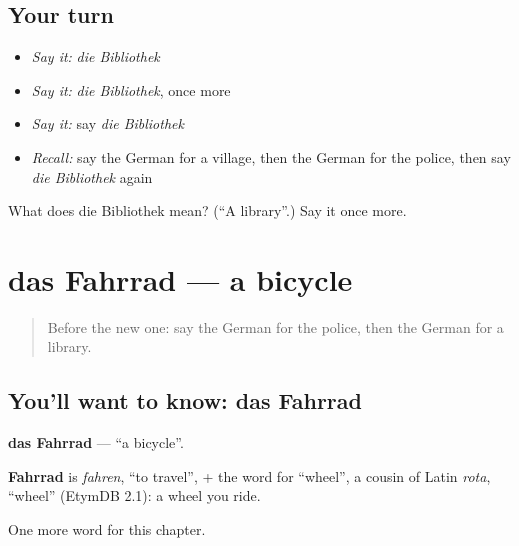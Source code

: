 \subsection*{Your turn}
\begin{itemize}
\raggedright
  \item \emph{Say it:} \emph{die Bibliothek}
  \item \emph{Say it:} \emph{die Bibliothek}, once more
  \item \emph{Say it:} say \emph{die Bibliothek}
  \item \emph{Recall:} say the German for a village, then the German for the police, then say \emph{die Bibliothek} again
\end{itemize}

\begin{tcolorbox}[breakable,colback=teal!4,colframe=teal!35!black,title={Before you move on}]
What does die Bibliothek mean? (\textquotedblleft{}A library\textquotedblright{}.) Say it once more.
\end{tcolorbox}
\section[das Fahrrad]{das Fahrrad — a bicycle}

\label{lesson:GE-C98-fahrrad}



\begin{quote}
Before the new one: say the German for the police, then the German for a library.
\end{quote}

\subsection*{You'll want to know: das Fahrrad}
\textbf{das Fahrrad} — \textquotedblleft{}a bicycle\textquotedblright{}.

\begin{cousinweb}
\textbf{Fahrrad} is \emph{fahren}, \textquotedblleft{}to travel\textquotedblright{}, + the word for \textquotedblleft{}wheel\textquotedblright{}, a cousin of Latin \emph{rota}, \textquotedblleft{}wheel\textquotedblright{} (EtymDB 2.1): a wheel you ride.
\end{cousinweb}

\begin{grammarlens}[title={What you've built}]
One more word for this chapter.
\end{grammarlens}

